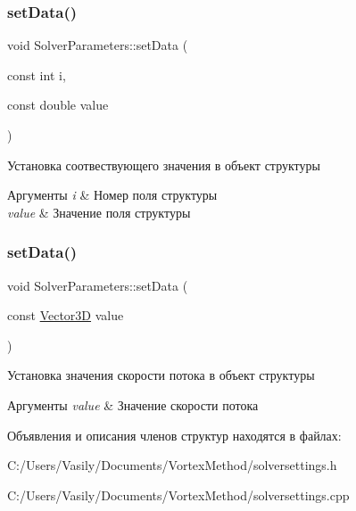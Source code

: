 \subsubsection{\texorpdfstring{set\+Data()}{setData()}\hspace{0.1cm}{\footnotesize\ttfamily [1/2]}}
{\footnotesize\ttfamily void Solver\+Parameters\+::set\+Data (\begin{DoxyParamCaption}\item[{const int}]{i,  }\item[{const double}]{value }\end{DoxyParamCaption})}

Установка соотвествующего значения в объект структуры 
\begin{DoxyParams}{Аргументы}
{\em i} & Номер поля структуры \\
\hline
{\em value} & Значение поля структуры \\
\hline
\end{DoxyParams}
\mbox{\label{struct_solver_parameters_a22cff4b592233c4e09d5d9e9de8e3265}} 
\subsubsection{\texorpdfstring{set\+Data()}{setData()}\hspace{0.1cm}{\footnotesize\ttfamily [2/2]}}
{\footnotesize\ttfamily void Solver\+Parameters\+::set\+Data (\begin{DoxyParamCaption}\item[{const \mbox{\hyperlink{class_vector3_d}{Vector3D}}}]{value }\end{DoxyParamCaption})}

Установка значения скорости потока в объект структуры 
\begin{DoxyParams}{Аргументы}
{\em value} & Значение скорости потока \\
\hline
\end{DoxyParams}


Объявления и описания членов структур находятся в файлах\+:\begin{DoxyCompactItemize}
\item 
C\+:/\+Users/\+Vasily/\+Documents/\+Vortex\+Method/solversettings.\+h\item 
C\+:/\+Users/\+Vasily/\+Documents/\+Vortex\+Method/solversettings.\+cpp\end{DoxyCompactItemize}
